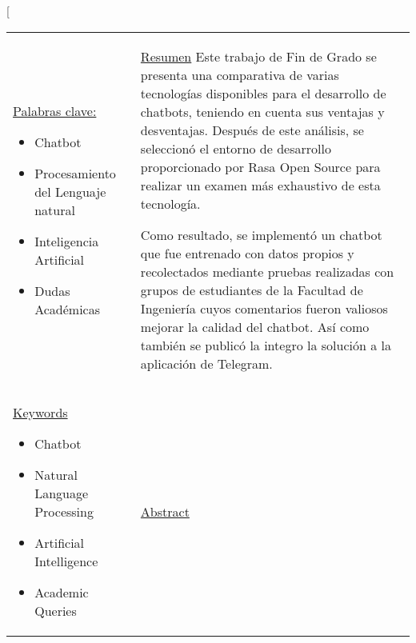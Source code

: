 \twocolumn[
	\begin{@twocolumnfalse}
		\maketitle
		\centering
		\begin{tabular}{p{6cm} p{10.3cm}} %
			\\ \hline

			\vspace{-0.1cm}
			\uline{Palabras clave:\hfill}
			\begin{itemize}
				\setlength\itemsep{-0.2em}
				\item Chatbot
				\item Procesamiento del Lenguaje natural
				\item Inteligencia Artificial
				\item Dudas Académicas
			\end{itemize}
			 & \vspace{-0.1cm}

			\uline{Resumen\hfill}
			Este trabajo de Fin de Grado se presenta una comparativa de varias
			tecnologías disponibles para el desarrollo de chatbots, teniendo en cuenta
			sus ventajas y
			desventajas. Después de este análisis, se seleccionó el entorno de
			desarrollo proporcionado por
			Rasa Open Source para realizar un examen más exhaustivo de esta tecnología.

			Como resultado, se implementó un chatbot que fue entrenado con datos propios y recolectados
			mediante pruebas realizadas con grupos de estudiantes de la Facultad de
			Ingeniería cuyos
			comentarios fueron valiosos mejorar la calidad del chatbot. Así como
			también se publicó la integro
			la solución a la aplicación de Telegram.
			\thispagestyle{firststyle}

			\text{}
			\\
			\uline{Keywords\hfill}
			\begin{itemize}
				\setlength\itemsep{-0.2em}
				\item Chatbot
				\item Natural Language Processing
				\item Artificial Intelligence
				\item Academic Queries
			\end{itemize}
			 &
			\uline{Abstract \hfill}


\end{tabular}
\end{@twocolumnfalse}
